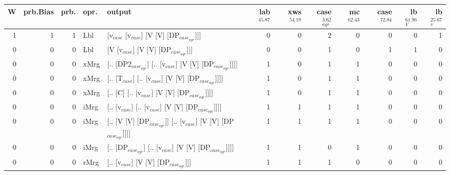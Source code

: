 \begin{tabularx}{\linewidth}{rrrlXrrrrrrr}
\hline
   W &   prb.Bias &   prb. & opr.   & output                                                         &   lab$^{45.87}$ &   xws$^{54.19}$ &   case$_{agr}^{3.62}$ &   mc$^{62.43}$ &   case$^{72.84}$ &   lb$_{V}^{61.96}$ &   lb$_{v}^{25.67}$ \\
\hline
   1 &       1 &   1 & Lbl  & [v$_{case}$ [v$_{case}$] [V [V] [DP$_{case_{agr}}$]]]                        &             0 &             0 &                  2 &            0 &              0 &              0 &              1 \\
   0 &       0 &   0 & Lbl  & [V [v$_{case}$] [V [V] [DP$_{case_{agr}}$]]]                             &             0 &             0 &                  1 &            0 &              1 &              1 &              0 \\
   0 &       0 &   0 & xMrg & [.. [DP2$_{case_{agr}}$] [.. [v$_{case}$] [V [V] [DP$_{case_{agr}}$]]]]        &             1 &             0 &                  1 &            1 &              0 &              0 &              0 \\
   0 &       0 &   0 & xMrg & [.. [T$_{case}$] [.. [v$_{case}$] [V [V] [DP$_{case_{agr}}$]]]]              &             1 &             0 &                  1 &            1 &              0 &              0 &              0 \\
   0 &       0 &   0 & xMrg & [.. [C] [.. [v$_{case}$] [V [V] [DP$_{case_{agr}}$]]]]                   &             1 &             0 &                  1 &            1 &              0 &              0 &              0 \\
   0 &       0 &   0 & iMrg & [.. [v$_{case}$] [.. [v$_{case}$] [V [V] [DP$_{case_{agr}}$]]]]              &             1 &             1 &                  1 &            1 &              0 &              0 &              0 \\
   0 &       0 &   0 & iMrg & [.. [V [V] [DP$_{case_{agr}}$]] [.. [v$_{case}$] [V [V] [DP$_{case_{agr}}$]]]] &             1 &             1 &                  1 &            1 &              0 &              0 &              0 \\
   0 &       0 &   0 & iMrg & [.. [DP$_{case_{agr}}$] [.. [v$_{case}$] [V [V] [DP$_{case_{agr}}$]]]]         &             1 &             1 &                  0 &            1 &              0 &              0 &              0 \\
   0 &       0 &   0 & rMrg & [.. [v$_{case}$] [V [V] [DP$_{case_{agr}}$]]]                            &             1 &             1 &                  1 &            0 &              0 &              0 &              0 \\
\hline
\end{tabularx}\endgroup\\
